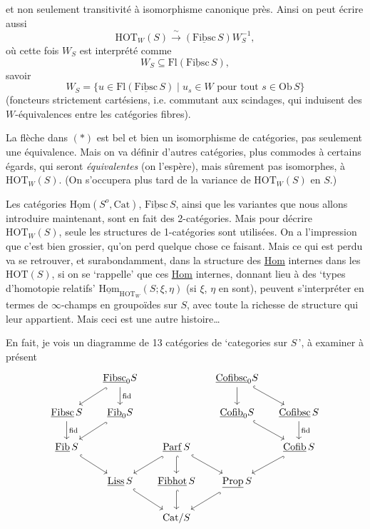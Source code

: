 \documentclass[11pt]{article}
\newcommand{\printedpage}[1]{\marginpar{\footnotesize p.~#1}}
\newcommand{\msp}[1]{\marginpar{\footnotesize [#1]}}
\newcommand{\ul}[1]{\underline{\mathrm{#1}}}
\begin{document}
\printedpage{4}
et non seulement transitivité à isomorphisme canonique près. Ainsi on peut écrire aussi
\[
\mathrm{HOT}_W(S) \xrightarrow{\ \sim\ } (\ul{Fibsc}\,S)W_S^{-1}, \tag*{$(*)$}
\]
où cette fois $W_S$ est interprété comme
\[
W_S \subseteq \mathrm{Fl}(\ul{Fibsc}\,S),
\]
savoir
\[
W_S = \{u \in \mathrm{Fl}(\ul{Fibsc}\,S) \mid u_s \in W \text{ pour tout } s \in \mathrm{Ob}\,S\}
\]
(foncteurs strictement cartésiens, i.e. commutant aux scindages, qui induisent des $W$-équivalences entre les catégories fibres).

La flèche dans $(*)$ est bel et bien un isomorphisme de catégories, pas seulement une équivalence. Mais on va définir d'autres catégories, plus commodes à certains égards, qui seront \textit{équivalentes} (on l'espère), mais sûrement pas isomorphes, à $\mathrm{HOT}_W(S)$. (On s'occupera plus tard de la variance de $\mathrm{HOT}_W(S)$ en $S$.)

Les catégories $\ul{Hom}(S^o,\mathrm{Cat})$, $\ul{Fibsc}\,S$, ainsi que les variantes que nous allons introduire maintenant, sont en fait des 2-catégories. Mais pour décrire $\mathrm{HOT}_W(S)$, seule les structures de 1-catégories sont utilisées. On a l'impression que c'est bien %
\msp{page 5}
grossier, qu'on perd quelque chose ce faisant. Mais ce qui est perdu va se retrouver, et surabondamment, dans la structure des \underline{Hom} internes dans les $\mathrm{HOT}(S)$, si on se `rappelle' que ces \underline{Hom} internes, donnant lieu à des `types d'homotopie relatifs' $\ul{Hom}_{\mathrm{HOT}_W}(S;\xi,\eta)$ (si $\xi$, $\eta$ en sont), peuvent s'interpréter en termes de $\infty$-champs en groupoïdes sur $S$, avec toute la richesse de structure qui leur appartient. Mais ceci est une autre histoire\dots

En fait, je vois un diagramme de 13 catégories de `categories sur $S$\,', à examiner à présent %
\[
\begin{tikzcd}[column sep=small]
 & \ul{Fibsc}_0S \arrow[dl, hook] \arrow[d, "\mathrm{fid}"] & & \ul{Cofibsc}_0S \arrow[d] \arrow[dr, hook] & \\
\ul{Fibsc}\,S \arrow[d, "\mathrm{fid}"] & \ul{Fib}_0S \arrow[dl, hook] & & \ul{Cofib}_0S \arrow[dr, hook] & \ul{Cofibsc}\,S \arrow[d, "\mathrm{fid}"] \\
\ul{Fib}\,S \arrow[dr, hook] & & \ul{Parf}\,S \arrow[dl, hook] \arrow[d, hook] \arrow[dr, hook] & & \ul{Cofib}\,S \arrow[dl, hook] \\
 & \ul{Liss}\,S \arrow[dr, hook] & \ul{Fibhot}\,S \arrow[d, hook] & \ul{Prop}\,S \arrow[dl, hook] & \\
 & & \mathrm{Cat}/S & &
\end{tikzcd}
\]
\end{document}
